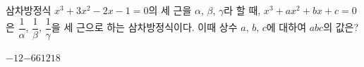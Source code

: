 삼차방정식 $x^3+3x^2-2x-1=0$의 세 근을 $\alpha$, $\beta$, $\gamma$라 할 때, $x^3+ax^2+bx+c=0$은 $\dfrac{1}{\alpha}$, $\dfrac{1}{\beta}$, $\dfrac{1}{\gamma}$을 세 근으로 하는 삼차방정식이다. 이때 상수 $a$, $b$, $c$에 대하여 $abc$의 값은?
\begin{choices32}{$-12$}{$-6$}{$6$}{$12$}{$18$}\end{choices32}
